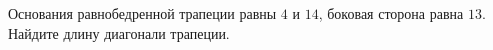 \begin{ex}
	\begin{condition}
		Основания равнобедренной трапеции равны \( 4 \) и \( 14 \), боковая сторона равна \( 13 \). Найдите длину диагонали трапеции.
	\end{condition}
\end{ex}